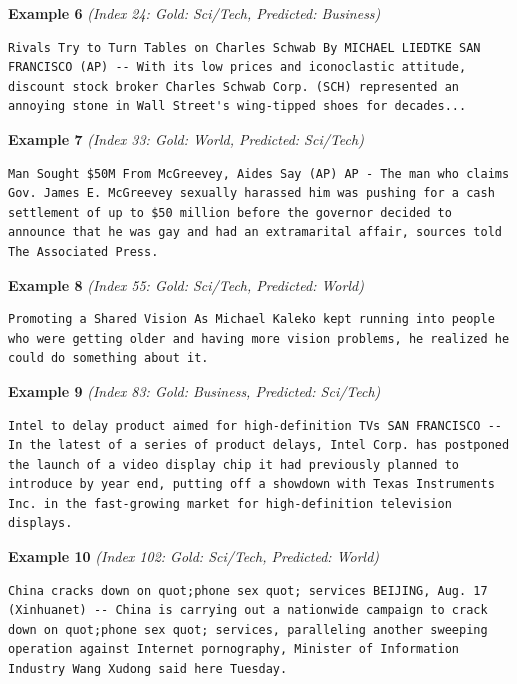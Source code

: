 \noindent
\textbf{Example 6} \quad \textit{(Index 24: Gold: Sci/Tech, Predicted: Business)}

\begin{Verbatim}[breaklines=true,breakanywhere=true,fontsize=\small]
Rivals Try to Turn Tables on Charles Schwab By MICHAEL LIEDTKE SAN FRANCISCO (AP) -- With its low prices and iconoclastic attitude, discount stock broker Charles Schwab Corp. (SCH) represented an annoying stone in Wall Street's wing-tipped shoes for decades...
\end{Verbatim}

\noindent
\textbf{Example 7} \quad \textit{(Index 33: Gold: World, Predicted: Sci/Tech)}

\begin{Verbatim}[breaklines=true,breakanywhere=true,fontsize=\small]
Man Sought $50M From McGreevey, Aides Say (AP) AP - The man who claims Gov. James E. McGreevey sexually harassed him was pushing for a cash settlement of up to $50 million before the governor decided to announce that he was gay and had an extramarital affair, sources told The Associated Press.
\end{Verbatim}

\noindent
\textbf{Example 8} \quad \textit{(Index 55: Gold: Sci/Tech, Predicted: World)}

\begin{Verbatim}[breaklines=true,breakanywhere=true,fontsize=\small]
Promoting a Shared Vision As Michael Kaleko kept running into people who were getting older and having more vision problems, he realized he could do something about it.
\end{Verbatim}

\noindent
\textbf{Example 9} \quad \textit{(Index 83: Gold: Business, Predicted: Sci/Tech)}

\begin{Verbatim}[breaklines=true,breakanywhere=true,fontsize=\small]
Intel to delay product aimed for high-definition TVs SAN FRANCISCO -- In the latest of a series of product delays, Intel Corp. has postponed the launch of a video display chip it had previously planned to introduce by year end, putting off a showdown with Texas Instruments Inc. in the fast-growing market for high-definition television displays.
\end{Verbatim}

\noindent
\textbf{Example 10} \quad \textit{(Index 102: Gold: Sci/Tech, Predicted: World)}

\begin{Verbatim}[breaklines=true,breakanywhere=true,fontsize=\small]
China cracks down on quot;phone sex quot; services BEIJING, Aug. 17 (Xinhuanet) -- China is carrying out a nationwide campaign to crack down on quot;phone sex quot; services, paralleling another sweeping operation against Internet pornography, Minister of Information Industry Wang Xudong said here Tuesday.
\end{Verbatim}

